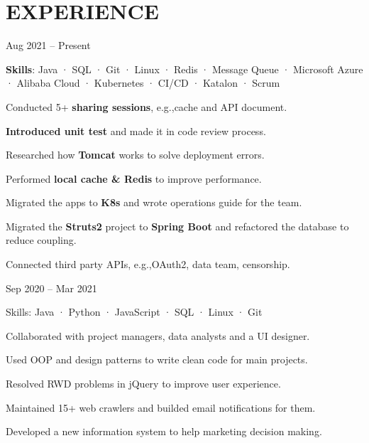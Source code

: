 \documentclass[]{resume}
\begin{document}
\hfill
\begin{minipage}[t]{0.68\textwidth} 


\section{EXPERIENCE}
Aug 2021 – Present \\
\vspace{\topsep} %
\begin{tightemize}
\item {\bf Skills}: Java · SQL · Git · Linux · Redis · Message Queue · Microsoft Azure · Alibaba Cloud · Kubernetes · CI/CD · Katalon · Scrum
\item Conducted 5+ {\bf sharing sessions}, e.g.,cache and API document. \\
\item {\bf Introduced unit test} and made it in code review process.
\item Researched how {\bf Tomcat} works to solve deployment errors.
\item Performed {\bf local cache \& Redis} to improve performance. \\
\item Migrated the apps to {\bf K8s } and wrote operations guide for the team.
\item Migrated the {\bf Struts2} project to {\bf Spring Boot} and refactored the database to reduce coupling.
\item Connected third party APIs, e.g.,OAuth2, data team, censorship.
\end{tightemize}
\sectionsep

Sep 2020 – Mar 2021
\begin{tightemize}
\item Skills: Java · Python · JavaScript · SQL · Linux · Git
\item Collaborated with project managers, data analysts and a UI designer. \\
\item Used OOP and design patterns to write clean code for main projects. \\
\item Resolved RWD problems in jQuery to improve user experience. \\
\item Maintained 15+ web crawlers and builded email notifications for them. \\
\item Developed a new information system to help marketing decision making.
\end{tightemize}
\sectionsep


\end{minipage}
\end{document}
